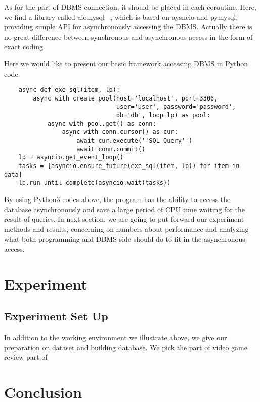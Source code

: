 \documentclass[onecolumn, conference, 12pt]{IEEEtran}
\begin{document}
	As for the part of DBMS connection, it should be placed in each coroutine. Here, we find a library called aiomysql ~\cite{aiomysql}, which is based on aysncio and pymysql, providing simple API for asynchronously accessing the DBMS. Actually there is no great difference between synchronous and asynchronous access in the form of exact coding. 

	Here we would like to present our basic framework accessing DBMS in Python code.
	\lstset{language=python,tabsize=2}
	\begin{lstlisting}
	async def exe_sql(item, lp):
		async with create_pool(host='localhost', port=3306,
							   user='user', password='password',
							   db='db', loop=lp) as pool:
			async with pool.get() as conn:
				async with conn.cursor() as cur:
					await cur.execute(''SQL Query'')
					await conn.commit()
	lp = asyncio.get_event_loop()
	tasks = [asyncio.ensure_future(exe_sql(item, lp)) for item in data]
	lp.run_until_complete(asyncio.wait(tasks))
	\end{lstlisting}
	By using Python3 codes above, the program has the ability to access the database asynchronously and save a large period of CPU time waiting for the result of queries. In next section, we are going to put forward our experiment methods and results, concerning on numbers about performance and analyzing what both programming and DBMS side should do to fit in the asynchronous access. 
	\section{Experiment}
	\subsection{Experiment Set Up}
	In addition to the working environment we illustrate above, we give our preparation on dataset and building database. 
	We pick the part of video game review part of ~\cite{Amazon}
	\section{Conclusion}
	
	
	
\end{document}
